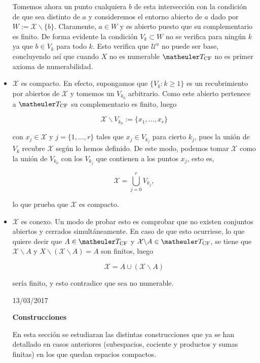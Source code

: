\begin{itemize}
Tomemos ahora un punto cualquiera $b$ de esta intersección con la condición de que sea distinto de $a$ y consideremos el entorno abierto de $a$ dado por $W:=\mathcal{X}\backslash \{b\}$. Claramente, $a\in W$ y es abierto puesto que su complementario es finito.  De forma evidente la condición $V_k \subset W$ no se verifica para ningún $k$ ya que $b\in V_k$ para todo $k$. Esto verifica que $\mathcal{U}^a$ no puede ser base, concluyendo así que cuando $X$ no es numerable $\T_{\text{CF}}$ no es primer axioma de numerabilidad.

\item $\mathcal{X}$ es compacto. En efecto, supongamos que $\{V_k : k \geq 1\}$ es un recubrimiento por abiertos de $\mathcal{X}$ y tomemos un $V_{k_0}$ arbitrario. Como este abierto pertenece a $\T_{\text{CF}}$ su complementario es finito, luego 

\[\mathcal{X} \backslash V_{k_0} := \{x_1, \ldots, x_r\}\]

con $x_j \in \mathcal{X}$ y $j=\{1,\ldots, r\}$ tales que $x_j\in V_{k_j}$ para cierto $k_j$, pues la unión de $V_k$ recubre $\mathcal{X}$ según lo hemos definido. De este modo, podemos tomar $\mathcal{X}$ como la unión de $V_{k_0}$ con los $V_{k_j}$ que contienen a los puntos $x_j$, esto es,

\[\mathcal{X}=\bigcup_{j=0}^r V_{k_j},\]

lo que prueba que $\mathcal{X}$ es compacto. 

\item $\mathcal{X}$ es conexo. Un modo de probar esto es comprobar que no existen conjuntos abiertos y cerrados simultáneamente. En caso de que esto ocurriese, lo que quiere decir que $A\in \T_{\text{CF}}$ y $\mathcal{X}\backslash A \in \T_{\text{CF}}$, se tiene que $\mathcal{X} \backslash A$ y $X\backslash (\mathcal{X}\backslash A)=A$ son finitos, luego

\[\mathcal{X}=A \cup (\mathcal{X}\backslash A)\]

sería finito, y esto contradice que sea no numerable. 



13/03/2017

\textbf{Construcciones}

En esta sección se estudiaran las distintas construcciones que ya se han detallado en casos anteriores (subespacios, cociente y productos y sumas finitas) en los que quedan espacios compactos. 


\end{itemize}
